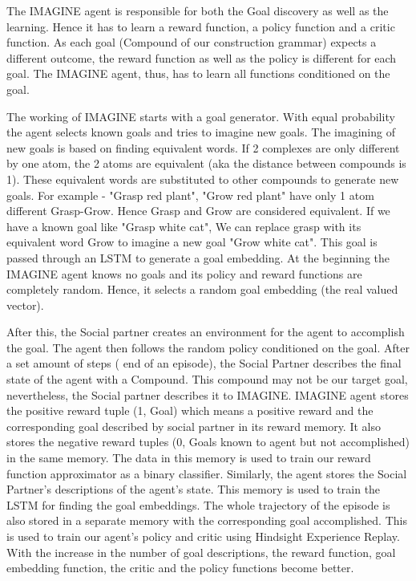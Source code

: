 \documentclass[10pt]{article}
\begin{document}
The IMAGINE agent is responsible for both the Goal discovery as well as the learning.
Hence it has to learn a reward function, a policy function and a critic function.
As each goal (Compound of our construction grammar) expects a different outcome, the reward function as well as the policy is different for each goal.
The IMAGINE agent, thus,  has to learn all functions conditioned on the goal.

The working of IMAGINE starts with a goal generator.
With equal probability the agent selects known goals and tries to imagine new goals.
The imagining of new goals is based on finding equivalent words.
If 2 complexes are only different  by one atom, the 2 atoms are equivalent (aka the distance between compounds is 1).
These equivalent words are substituted to other compounds to generate new goals.
For example - "Grasp red plant", "Grow red plant" have only 1 atom different Grasp-Grow.
Hence Grasp and Grow are considered equivalent.
If we have a known goal like "Grasp white cat", We can replace grasp with its equivalent word Grow to imagine a new goal "Grow white cat".
This goal is passed through an LSTM to generate a goal embedding.
At the beginning the IMAGINE agent knows no goals and its policy and reward functions are completely random.
Hence, it selects a random goal embedding (the real valued vector).

After this, the Social partner creates an environment for the agent to accomplish the goal.
The agent then follows the random policy conditioned on the goal.
After a set amount of steps ( end of an episode), the Social Partner describes the final state of the agent with a Compound. This compound may not be our target goal, nevertheless, the Social partner describes it to IMAGINE.
IMAGINE agent stores the positive reward tuple (1, Goal) which means a positive reward and the corresponding goal described by social partner in its reward memory.
It also stores the negative reward tuples (0, Goals known to agent but not accomplished) in the same memory.
The data in this memory is used to train our reward function approximator as a binary classifier.
Similarly, the agent stores the Social Partner's descriptions of the agent's state. This memory is used to train the LSTM for finding the goal embeddings.
The whole trajectory of the episode is also stored in a separate memory with the corresponding goal accomplished.
This is used to train our agent's policy and critic using Hindsight Experience Replay.
With the increase in the number of goal descriptions, the reward function, goal embedding function, the critic and the policy functions become better.
\end{document}
